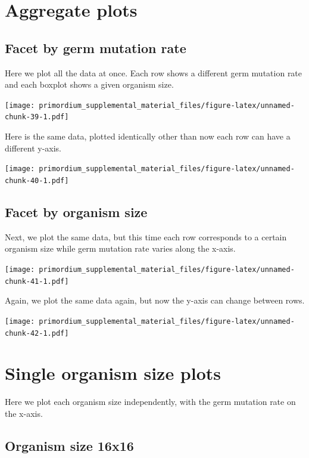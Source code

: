\documentclass[]{book}
\begin{document}
\hypertarget{aggregate-plots-2}{%
\section{Aggregate plots}\label{aggregate-plots-2}}

\hypertarget{facet-by-germ-mutation-rate}{%
\subsection{Facet by germ mutation rate}\label{facet-by-germ-mutation-rate}}

Here we plot all the data at once.
Each row shows a different germ mutation rate and each boxplot shows a given organism size.

\texttt{[image: primordium\_supplemental\_material\_files/figure-latex/unnamed-chunk-39-1.pdf]}

Here is the same data, plotted identically other than now each row can have a different y-axis.

\texttt{[image: primordium\_supplemental\_material\_files/figure-latex/unnamed-chunk-40-1.pdf]}

\hypertarget{facet-by-organism-size-1}{%
\subsection{Facet by organism size}\label{facet-by-organism-size-1}}

Next, we plot the same data, but this time each row corresponds to a certain organism size while germ mutation rate varies along the x-axis.

\texttt{[image: primordium\_supplemental\_material\_files/figure-latex/unnamed-chunk-41-1.pdf]}

Again, we plot the same data again, but now the y-axis can change between rows.

\texttt{[image: primordium\_supplemental\_material\_files/figure-latex/unnamed-chunk-42-1.pdf]}

\hypertarget{single-organism-size-plots-1}{%
\section{Single organism size plots}\label{single-organism-size-plots-1}}

Here we plot each organism size independently, with the germ mutation rate on the x-axis.

\hypertarget{organism-size-16x16-1}{%
\subsection{Organism size 16x16}\label{organism-size-16x16-1}}
\end{document}
